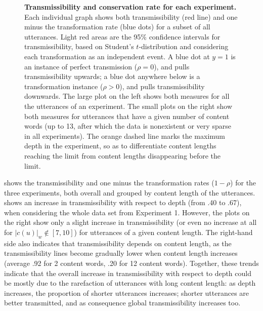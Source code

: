 \begin{figure}[!ht]
  \centering


  \caption[Transmissibility and conservation rate for each experiment]{
  \textbf{Transmissibility and conservation rate for each experiment.}
  Each individual graph shows both transmissibility (red line) and one minus the transformation rate (blue dots) for a subset of all utterances.
  Light red areas are the 95\% confidence intervals for transmissibility, based on Student's $t$-distribution and considering each transformation as an independent event.
  A blue dot at $y = 1$ is an instance of perfect transmission ($\rho = 0$), and pulls transmissibility upwards;
  a blue dot anywhere below is a transformation instance ($\rho > 0$), and pulls transmissibility downwards.
  The large plot on the left shows both measures for all the utterances of an experiment.
  The small plots on the right show both measures for utterances that have a given number of content words (up to 13, after which the data is nonexistent or very sparse in all experiments).
  The orange dashed line marks the maximum depth in the experiment, so as to differentiate content lengths reaching the limit from content lengths disappearing before the limit.
  }
  \label{fig:gistr-octrans}
\end{figure}

 shows the transmissibility and one minus the
transformation rates (\(1 - \rho\)) for the three experiments, both
overall and grouped by content length of the utterances.
 shows an increase in transmissibility
with respect to depth (from .40 to .67), when considering the whole data
set from Experiment 1. However, the plots on the right show only a
slight increase in transmissibility (or even no increase at all for
\(|c(u)|_w \notin [7, 10]\)) for utterances of a given content length.
The right-hand side also indicates that transmissibility depends on
content length, as the transmissibility lines become gradually lower
when content length increases (average .92 for 2 content words, .20 for
12 content words). Together, these trends indicate that the overall
increase in transmissibility with respect to depth could be mostly due
to the rarefaction of utterances with long content length: as depth
increases, the proportion of shorter utterances increases; shorter
utterances are better transmitted, and as consequence global
transmissibility increases too.

